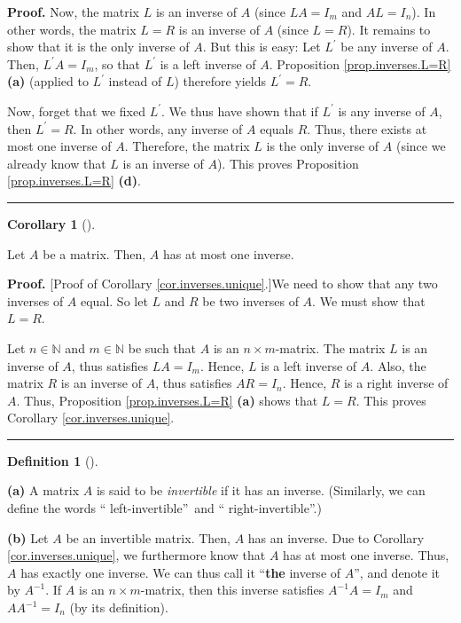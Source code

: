 \documentclass[numbers=enddot,12pt,final,onecolumn,notitlepage]{scrartcl}%
\theoremstyle{definition}
\newtheorem{defi}[theo]{Definition}
\newenvironment{definition}[1][]
{\begin{defi}[#1]\begin{leftbar}}
{\end{leftbar}\end{defi}}
\newtheorem{coro}[theo]{Corollary}
\newenvironment{corollary}[1][]
{\begin{coro}[#1]\begin{leftbar}}
{\end{leftbar}\end{coro}}
\newenvironment{proof}[1][Proof]{\noindent\textbf{#1.} }{\ \rule{0.5em}{0.5em}}
\begin{document}
\begin{proof}
Now, the matrix $L$ is an inverse of $A$ (since $LA=I_{m}$ and $AL=I_{n}$). In
other words, the matrix $L=R$ is an inverse of $A$ (since $L=R$). It remains
to show that it is the only inverse of $A$. But this is easy: Let $L^{\prime}$
be any inverse of $A$. Then, $L^{\prime}A=I_{m}$, so that $L^{\prime}$ is a
left inverse of $A$. Proposition \ref{prop.inverses.L=R} \textbf{(a)} (applied
to $L^{\prime}$ instead of $L$) therefore yields $L^{\prime}=R$.

Now, forget that we fixed $L^{\prime}$. We thus have shown that if $L^{\prime
}$ is any inverse of $A$, then $L^{\prime}=R$. In other words, any inverse of
$A$ equals $R$. Thus, there exists at most one inverse of $A$. Therefore, the
matrix $L$ is the only inverse of $A$ (since we already know that $L$ is an
inverse of $A$). This proves Proposition \ref{prop.inverses.L=R} \textbf{(d)}.
\end{proof}

\begin{corollary}
\label{cor.inverses.unique}Let $A$ be a matrix. Then, $A$ has at most one inverse.
\end{corollary}

\begin{proof}
[Proof of Corollary \ref{cor.inverses.unique}.]We need to show that any two
inverses of $A$ equal. So let $L$ and $R$ be two inverses of $A$. We must show
that $L=R$.

Let $n\in\mathbb{N}$ and $m\in\mathbb{N}$ be such that $A$ is an $n\times
m$-matrix. The matrix $L$ is an inverse of $A$, thus satisfies $LA=I_{m}$.
Hence, $L$ is a left inverse of $A$. Also, the matrix $R$ is an inverse of
$A$, thus satisfies $AR=I_{n}$. Hence, $R$ is a right inverse of $A$. Thus,
Proposition \ref{prop.inverses.L=R} \textbf{(a)} shows that $L=R$. This proves
Corollary \ref{cor.inverses.unique}.
\end{proof}

\begin{definition}
\textbf{(a)} A matrix $A$ is said to be \textit{invertible} if it has an
inverse. (Similarly, we can define the words \textquotedblleft
left-invertible\textquotedblright\ and \textquotedblleft
right-invertible\textquotedblright.)

\textbf{(b)} Let $A$ be an invertible matrix. Then, $A$ has an inverse. Due to
Corollary \ref{cor.inverses.unique}, we furthermore know that $A$ has at most
one inverse. Thus, $A$ has exactly one inverse. We can thus call it
\textquotedblleft\textbf{the} inverse of $A$\textquotedblright, and denote it
by $A^{-1}$. If $A$ is an $n\times m$-matrix, then this inverse satisfies
$A^{-1}A=I_{m}$ and $AA^{-1}=I_{n}$ (by its definition).
\end{definition}
\end{document}
